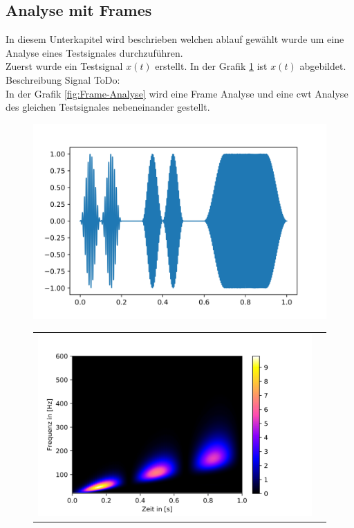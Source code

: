 \subsection{Analyse mit Frames}
In diesem Unterkapitel wird beschrieben welchen ablauf gewählt wurde um eine Analyse eines Testsignales durchzuführen.\\
Zuerst wurde ein Testsignal $x(t)$ erstellt. In der Grafik \ref{fig:frame-testsig} ist $x(t)$ abgebildet. \\
Beschreibung Signal ToDo:\\

In der Grafik \ref{fig:Frame-Analyse} wird eine Frame Analyse und eine cwt Analyse des gleichen Testsignales nebeneinander gestellt. 
\begin{figure}[!ht]
	\centering
	\includegraphics[width=\linewidth]{papers/autotune/sections/frames/images/testsig.jpg}
	\label{fig:frame-testsig}
	\begin{tabularx}{\columnwidth}{XX}
		\includegraphics[width=1.3\linewidth]{papers/autotune/sections/frames/images/sincosmcwt.jpg}

\end{tabularx}
\end{figure}
